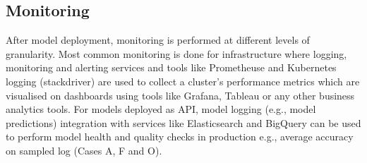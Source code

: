 
\subsection{Monitoring}
After model deployment, monitoring is performed at different levels of granularity. Most common monitoring is done for infrastructure where logging, monitoring and alerting services and tools like Prometheuse and Kubernetes logging (stackdriver) are used to collect a cluster's performance metrics which are visualised on dashboards using tools like Grafana, Tableau or any other business analytics tools. For models deployed as API, model logging (e.g., model predictions) integration with services like Elasticsearch and BigQuery can be used to perform model health and quality checks in production e.g., average accuracy on sampled log (Cases A, F and O).


